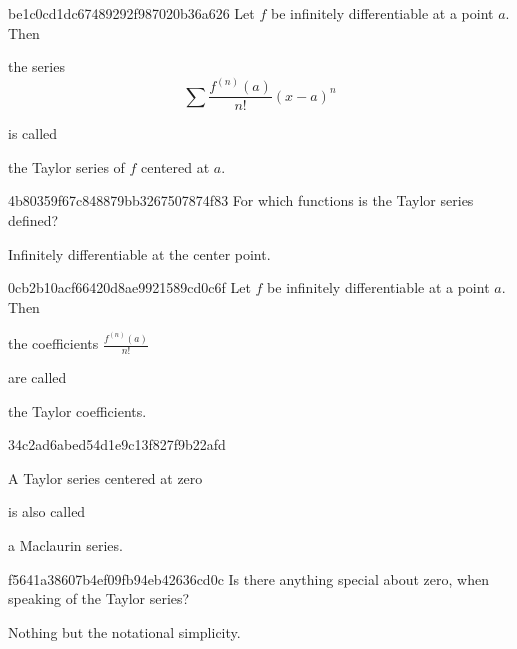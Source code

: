 \begin{note}{be1c0cd1dc67489292f987020b36a626}
    Let \({ f }\) be infinitely differentiable at a point \({ a }\).
    Then
    \begin{icloze}{2}
        the series
        \[
            \sum \frac{f^{(n)}(a)}{n!} (x - a)^{n}
        \]
    \end{icloze}
    is called \begin{icloze}{1}the Taylor series of \({ f }\) centered at \({ a }\).\end{icloze}
\end{note}

\begin{note}{4b80359f67c848879bb3267507874f83}
    For which functions is the Taylor series defined?

    \begin{cloze}{1}
        Infinitely differentiable at the center point.
    \end{cloze}
\end{note}

\begin{note}{0cb2b10acf66420d8ae9921589cd0c6f}
    Let \({ f }\) be infinitely differentiable at a point \({ a }\).
    Then \begin{icloze}{2}the coefficients \({ \frac{f^{(n)}(a)}{n!} }\)\end{icloze} are called \begin{icloze}{1}the Taylor coefficients.\end{icloze}
\end{note}

\begin{note}{34c2ad6abed54d1e9c13f827f9b22afd}
    \begin{icloze}{2}A Taylor series centered at zero\end{icloze} is also called \begin{icloze}{1}a Maclaurin series.\end{icloze}
\end{note}

\begin{note}{f5641a38607b4ef09fb94eb42636cd0c}
    Is there anything special about zero, when speaking of the Taylor series?

    \begin{cloze}{1}
        Nothing but the notational simplicity.
    \end{cloze}
\end{note}

